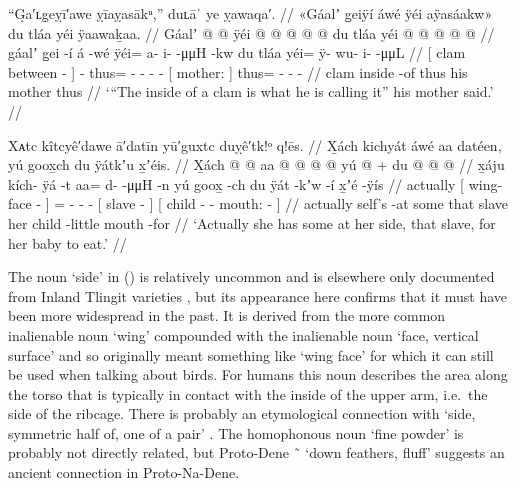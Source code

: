 \ex\label{ex:90-74-inside-of-clam}%
%
\begingl
	\glpreamble	“G̣a′ʟg̣eỵī′awe ỵīaỵasākᵘ,” duʟāˈ ye ỵawaqa′. //
	\glpreamble	«\!Gáalʼ g̱eiÿí áwé ÿéi aÿasáakw\!» du tláa yéi ÿaawaḵaa. //
	\gla	{} Gáalʼ  @ {} {}
		 @ {}
		ÿéi @  @ {} @ {} @ {} @ {}
		{} du tláa {}
		yéi @  @ {} @ {} @ {} @ {} //
	\glb	{} gáalʼ g̱ei -í {}
		á -wé
		ÿéi= a- i-  -μμH -kw
		{} du tláa {}
		yéi= ÿ- wu- i-  -μμL //
	\glc	{}[ clam between - {}]
		 -
		thus= - -  - -
		{}[  mother: {}]
		thus= - -  - //
	\gld	{} clam inside -of {}
		 {}
		thus  {} {} {} {}
		{} his mother {}
		thus  {} {} {} {} // 
	\glft	‘“The inside of a clam is what he is calling it” his mother said.’
		//
\endgl
\xe

\ex\label{ex:90-75-some-along-side}%
%
\begingl
	\glpreamble	Xᴀtc kîtcyê′dawe ā′datīn yū′guxtc duỵê′tk!ᵒ q!ēs. //
	\glpreamble	X̱ách kichyát áwé aa datéen, yú goox̱ch du ÿátkʼu x̱ʼéis. //
	\gla	X̱ách
		{} {}  @ {} @ {} {}
		aa @  @ {} @ {} @ {}
		{} yú  @ {} {} +
		{} du  @ {} @ {}  @ {} {} //
	\glb	x̱áju
		{} {} kích- ÿá -t {}
		aa= d-  -μμH -n
		{} yú goox̱ -ch {}
		{} du ÿát -kʼw -í x̱ʼé -ÿís {} //
	\glc	actually
		{}[  wing- face - {}]
		= -  - -
		{}[  slave - {}]
		{}[  child - - mouth: - {}] //
	\gld	actually
		{} self’s  {} -at {}
		some  {} {} {}
		{} that slave {} {}
		{} her child -little {} mouth -for {} //
	\glft	‘Actually she has some at her side, that slave, for her baby to eat.’
		//
\endgl
\xe

The noun  ‘side’ in (\lastx) is relatively uncommon and is elsewhere only documented from Inland Tlingit varieties \parencite[\textsc{t}·38]{leer:2001}, but its appearance here confirms that it must have been more widespread in the past.
It is derived from the more common inalienable noun  ‘wing’ compounded with the inalienable noun  ‘face, vertical surface’ and so originally meant something like ‘wing face’ for which it can still be used when talking about birds.
For humans this noun describes the area along the torso that is typically in contact with the inside of the upper arm, i.e.\ the side of the ribcage.
There is probably an etymological connection with  ‘side, symmetric half of, one of a pair’ \parencite[f06/123]{leer:1973}.
The homophonous noun  ‘fine powder’ is probably not directly related, but Proto-Dene  \~\  ‘down feathers, fluff’ \parencites[62]{leer:1978b}[/42]{leer:1996i} suggests an ancient connection in Proto-Na-Dene.

